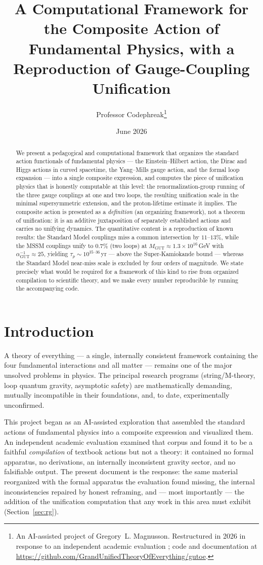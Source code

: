 \documentclass[11pt]{article}
\title{A Computational Framework for the Composite Action of
Fundamental Physics, with a Reproduction of Gauge-Coupling Unification}
\author{Professor Codephreak\thanks{An AI-assisted project of
Gregory~L. Magnusson. Restructured in 2026 in response to an independent
academic evaluation \cite{evaluation}; code and documentation at
\url{https://github.com/GrandUnifiedTheoryOfEverything/gutoe}.}}
\date{June 2026}
\theoremstyle{remark}
\begin{document}
\maketitle

\begin{abstract}
We present a pedagogical and computational framework that organizes the
standard action functionals of fundamental physics --- the
Einstein--Hilbert action, the Dirac and Higgs actions in curved
spacetime, the Yang--Mills gauge action, and the formal loop expansion
--- into a single composite expression, and computes the piece of
unification physics that is honestly computable at this level: the
renormalization-group running of the three gauge couplings at one and
two loops, the resulting unification scale in the minimal supersymmetric
extension, and the proton-lifetime estimate it implies. The composite
action is presented as a \emph{definition} (an organizing framework),
not a theorem of unification: it is an additive juxtaposition of
separately established actions and carries no unifying dynamics. The
quantitative content is a reproduction of known results: the Standard
Model couplings miss a common intersection by $11$--$13\%$, while the
MSSM couplings unify to $0.7\%$ (two loops) at $M_{\mathrm{GUT}} \approx
1.3\times10^{16}\,$GeV with $\alpha_{\mathrm{GUT}}^{-1}\approx 25$,
yielding $\tau_p \sim 10^{35\text{--}36}$\,yr --- above the
Super-Kamiokande bound --- whereas the Standard Model near-miss scale is
excluded by four orders of magnitude. We state precisely what would be
required for a framework of this kind to rise from organized compilation
to scientific theory, and we make every number reproducible by running
the accompanying code.
\end{abstract}

\section{Introduction}

A theory of everything --- a single, internally consistent framework
containing the four fundamental interactions and all matter --- remains
one of the major unsolved problems in physics. The principal research
programs (string/M-theory, loop quantum gravity, asymptotic safety) are
mathematically demanding, mutually incompatible in their foundations,
and, to date, experimentally unconfirmed.

This project began as an AI-assisted exploration that assembled the
standard actions of fundamental physics into a composite expression and
visualized them. An independent academic evaluation \cite{evaluation}
examined that corpus and found it to be a faithful \emph{compilation} of
textbook actions but not a theory: it contained no formal apparatus, no
derivations, an internally inconsistent gravity sector, and no
falsifiable output. The present document is the response: the same
material reorganized with the formal apparatus the evaluation found
missing, the internal inconsistencies repaired by honest reframing, and
--- most importantly --- the addition of the unification computation
that any work in this area must exhibit (Section~\ref{sec:rg}).
\end{document}
